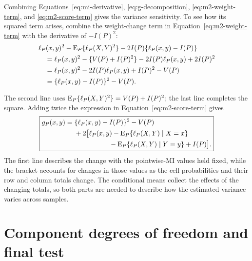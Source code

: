 Combining Equations~\eqref{eq:mi-derivative},
\eqref{eq:g-decomposition}, \eqref{eq:m2-weight-term}, and
\eqref{eq:m2-score-term} gives the variance sensitivity. To see how its
squared term arises, combine the weight-change term in
Equation~\eqref{eq:m2-weight-term} with the derivative of \(-I(P)^2\):
\begin{align*}
 &\ell_P(x,y)^2-\operatorname{E}_P\{\ell_P(X,Y)^2\}
       -2I(P)\{\ell_P(x,y)-I(P)\}\\*
 &\quad=\ell_P(x,y)^2-\{V(P)+I(P)^2\}
       -2I(P)\ell_P(x,y)+2I(P)^2\\*
 &\quad=\ell_P(x,y)^2-2I(P)\ell_P(x,y)+I(P)^2-V(P)\\*
 &\quad=\{\ell_P(x,y)-I(P)\}^2-V(P).
\end{align*}
\begin{samepage}%
The second line uses
\(\operatorname{E}_P\{\ell_P(X,Y)^2\}=V(P)+I(P)^2\); the last line completes the
square. Adding twice the expression in Equation~\eqref{eq:m2-score-term}
gives
\begin{equation}
\boxed{
\begin{aligned}
g_P(x,y)
={}&\{\pmi_P(x,y)-I(P)\}^2-V(P)\\
&+2\bigl[
\pmi_P(x,y)
-\E_P\{\pmi_P(X,Y)\mid X=x\}\\
&\hspace{18mm}
-\E_P\{\pmi_P(X,Y)\mid Y=y\}
+I(P)
\bigr].
\end{aligned}
}
\label{eq:g-final}
\end{equation}
The first line describes the change with the pointwise-MI values held
fixed, while the bracket accounts for changes in those values as the cell
probabilities and their row and column totals change. The conditional
means collect the effects of the changing totals, so both parts are needed
to describe how the estimated variance varies across samples.
\par
\end{samepage}

\section{Component degrees of freedom and final test}
\label{sec:component-df}


